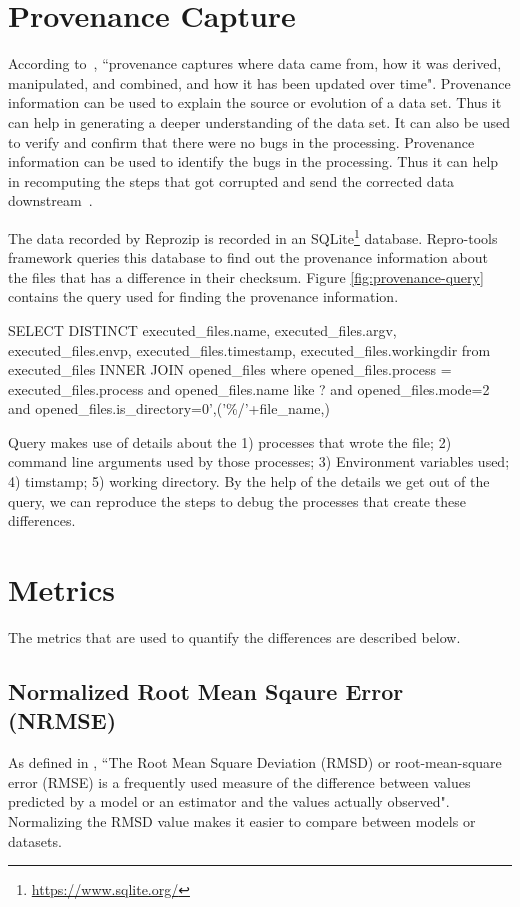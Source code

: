 \section{Provenance Capture}
According to~\cite{Ikeda:2010:PSP:1855795.1855800}, ``provenance captures where data came from, how it was derived, manipulated, and combined, and how it has been updated over time". Provenance information can be used to explain the source or evolution of a data set. Thus it can help in generating a deeper understanding of the data set. It can also be used to verify and confirm that there were no bugs in the processing. Provenance information can be used to identify the bugs in the processing. Thus it can help in recomputing the steps that got corrupted and send the corrected data downstream~\cite{Ikeda:2010:PSP:1855795.1855800}.

The data recorded by Reprozip is recorded in an SQLite\footnote{\url{https://www.sqlite.org/}} database. Repro-tools framework queries this database to find out the provenance information about the files that has a difference in their checksum. Figure \ref{fig:provenance-query} contains the query used for finding the provenance information.\\

\begin{tcolorbox}[colback=black!5!white,colframe=black!75!black]
SELECT DISTINCT executed\_files.name, executed\_files.argv, executed\_files.envp, executed\_files.timestamp, executed\_files.workingdir from executed\_files INNER JOIN opened\_files where opened\_files.process = executed\_files.process and opened\_files.name like ? and opened\_files.mode=2 and opened\_files.is\_directory=0',('\%/'+file\_name,)
\end{tcolorbox}
\label{fig:provenance-query}

Query makes use of details about the 1) processes that wrote the file; 2) command line arguments used by those processes; 3) Environment variables used; 4) timstamp; 5) working directory. By the help of the details we get out of the query, we can reproduce the steps to debug the processes that create these differences.

\section{Metrics} \label{sec:num1}
The metrics that are used to quantify the differences are described below.

\subsection{Normalized Root Mean Sqaure Error (NRMSE)}
As defined in \cite{khosrow2017handbook}, ``The Root Mean Square Deviation (RMSD) or root-mean-square error (RMSE) is a frequently used measure of the difference between values predicted by a model or an estimator and the values actually observed". Normalizing the RMSD value makes it easier to compare between models or datasets.

